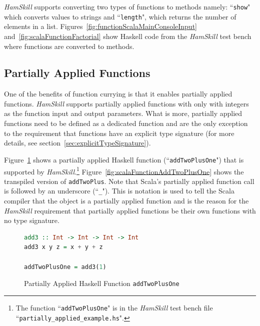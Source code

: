 \documentclass{report}
\begin{document}
\textit{HamSkill} supports converting two types of functions to methods namely: ``\texttt{show}" which converts values to strings and ``\texttt{length}", which returns the number of elements in a list.  Figures~\ref{fig:functionScalaMainConsoleInput} and~\ref{fig:scalaFunctionFactorial} show Haskell code from the \textit{HamSkill} test bench where functions are converted to methods.

\subsection{Partially Applied Functions}\label{sec:partiallyAppliedFunctions}

One of the benefits of function currying is that it enables partially applied functions.  \textit{HamSkill} supports partially applied functions with only with integers as the function input and output parameters.  What is more, partially applied functions need to be defined as a dedicated function and are the only exception to the requirement that functions have an explicit type signature (for more details, see section~\ref{sec:explicitTypeSignature}).  

Figure~\ref{fig:haskellFunctionAddTwoPlusOne} shows a partially applied Haskell function (``\texttt{addTwoPlusOne}") that is supported by \textit{HamSkill}.\footnote{The function ``\texttt{addTwoPlusOne}" is in the \textit{HamSkill} test bench file ``\texttt{partially\_applied\_example.hs}".}  Figure~\ref{fig:scalaFunctionAddTwoPlusOne} shows the transpiled version of \texttt{addTwoPlus}.  Note that Scala's partially applied function call is followed by an underscore (``\texttt{\_}").  This is notation is used to tell the Scala compiler that the object is a partially applied function and is the reason for the \textit{HamSkill} requirement that partially applied functions be their own functions with no type signature.

\begin{figure}[H]
\begin{mdframed}
\begin{lstlisting}[language=Haskell]
add3 :: Int -> Int -> Int -> Int
add3 x y z = x + y + z

addTwoPlusOne = add3(1)
\end{lstlisting}
\end{mdframed}
\caption{Partially Applied Haskell Function \texttt{addTwoPlusOne}}\label{fig:haskellFunctionAddTwoPlusOne}
\end{figure}
\end{document}
